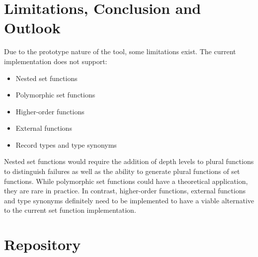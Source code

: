 \documentclass[a4paper, 11pt, fleqn]{scrreprt}
\begin{document}
\chapter{Limitations, Conclusion and Outlook}
Due to the prototype nature of the tool, some limitations exist. The current implementation does not support:
\begin{itemize}
    \item Nested set functions
    \item Polymorphic set functions
    \item Higher-order functions
    \item External functions
    \item Record types and type synonyms
\end{itemize}
Nested set functions would require the addition of depth levels to plural functions to distinguish failures as well as the ability to generate plural functions of set functions. While polymorphic set functions could have a theoretical application, they are rare in practice. In contrast, higher-order functions, external functions and type synonyms definitely need to be implemented to have a viable alternative to the current set function implementation.






\appendix
\chapter{Repository}
\end{document}
